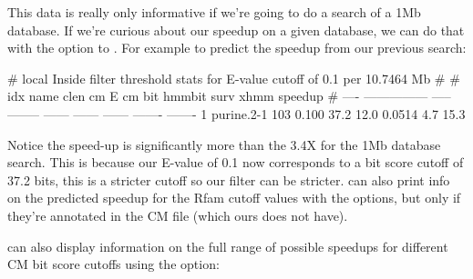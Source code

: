 This data is really only informative if we're going to do a search of
a 1Mb database. If we're curious about our speedup on a given
database, we can do that with the  option to
. For example to predict the speedup from our previous
search: 


\begin{sreoutput}
# local Inside filter threshold stats for E-value cutoff of  0.1 per 10.7464 Mb
#
#  idx  name              clen      cm E  cm bit  hmmbit    surv     xhmm  speedup
# ----  ---------------  -----  --------  ------  ------  ------  -------  -------
     1  purine.2-1         103     0.100    37.2    12.0  0.0514      4.7     15.3
\end{sreoutput}

Notice the speed-up is significantly more than the 3.4X for the 1Mb
database search. This is because our E-value of 0.1 now corresponds to
a bit score cutoff of 37.2 bits, this is a stricter cutoff so our
filter can be stricter. can also print info on the
predicted speedup for the Rfam cutoff values with the  options, but only if they're annotated in the CM file
(which ours does not have). 

 can also display information on the full range of
possible speedups for different CM bit score cutoffs using the
 option: 


